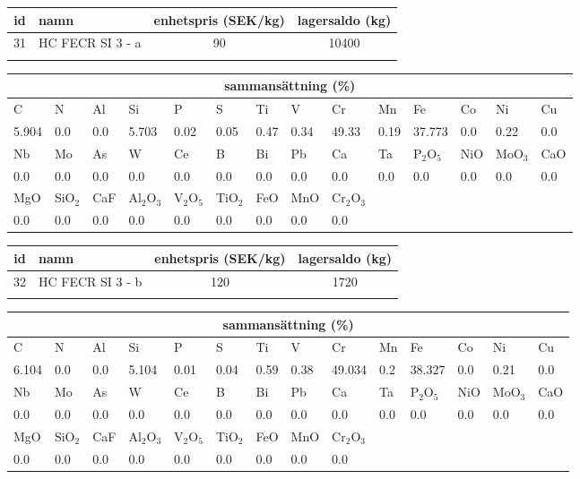 \begin{center}
{\scriptsize\addtolength{\tabcolsep}{-3pt}
\begin{tabular}{clcc}
id&namn&enhetspris (SEK/kg)&lagersaldo (kg)\\
\hline
31&HC FECR SI 3 - a&90&10400\\\\
\end{tabular}
\begin{tabular}{llllllllllllll}
\multicolumn{14}{c}{sammansättning (\%)}\\
\hline
C&N&Al&Si&P&S&Ti&V&Cr&Mn&Fe&Co&Ni&Cu\\
\hline
5.904&0.0&0.0&5.703& 0.02&0.05&0.47&0.34& 49.33&0.19&37.773&0.0& 0.22&0.0\\
\hline
Nb&Mo&As&W&Ce&B&Bi&Pb&Ca&Ta&P$_2$O$_5$&NiO&MoO$_3$&CaO\\
\hline
0.0& 0.0& 0.0& 0.0& 0.0& 0.0& 0.0& 0.0& 0.0& 0.0& 0.0& 0.0& 0.0& 0.0\\
\hline
MgO&SiO$_2$&CaF&Al$_2$O$_3$&V$_2$O$_5$&TiO$_2$&FeO&MnO&Cr$_2$O$_3$\\
\hline
0.0& 0.0& 0.0& 0.0& 0.0& 0.0& 0.0& 0.0& 0.0\\
\end{tabular}
}
\end{center}

\begin{center}
{\scriptsize\addtolength{\tabcolsep}{-3pt}
\begin{tabular}{clcc}
id&namn&enhetspris (SEK/kg)&lagersaldo (kg)\\
\hline
32&HC FECR SI 3 - b&120&1720\\\\
\end{tabular}
\begin{tabular}{llllllllllllll}
\multicolumn{14}{c}{sammansättning (\%)}\\
\hline
C&N&Al&Si&P&S&Ti&V&Cr&Mn&Fe&Co&Ni&Cu\\
\hline
6.104&0.0&0.0&5.104& 0.01&0.04&0.59&0.38& 49.034&0.2&38.327&0.0& 0.21&0.0\\
\hline
Nb&Mo&As&W&Ce&B&Bi&Pb&Ca&Ta&P$_2$O$_5$&NiO&MoO$_3$&CaO\\
\hline
0.0& 0.0& 0.0& 0.0& 0.0& 0.0& 0.0& 0.0& 0.0& 0.0& 0.0& 0.0& 0.0& 0.0\\
\hline
MgO&SiO$_2$&CaF&Al$_2$O$_3$&V$_2$O$_5$&TiO$_2$&FeO&MnO&Cr$_2$O$_3$\\
\hline
0.0& 0.0& 0.0& 0.0& 0.0& 0.0& 0.0& 0.0& 0.0\\
\end{tabular}
}
\end{center}

